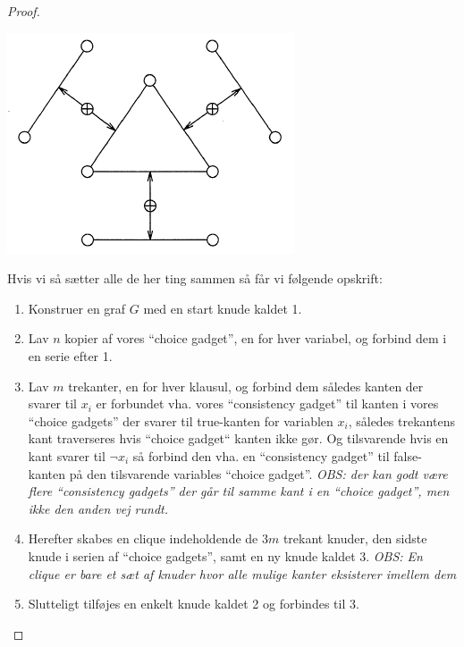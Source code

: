 \begin{proof}
\begin{center}
 \includegraphics[bb=0 0 241 185]{./constraintGadget.png}
\end{center}

Hvis vi så sætter alle de her ting sammen så får vi følgende opskrift:\\
\begin{enumerate}
 \item Konstruer en graf $G$ med en start knude kaldet 1.

 \item Lav $n$ kopier af vores ``choice gadget'', en for hver variabel, og
	 forbind dem i en serie efter 1.

 \item Lav $m$ trekanter, en for hver klausul, og forbind dem således kanten
	 der svarer til $x_i$ er forbundet vha. vores ``consistency gadget'' til
	 kanten i vores ``choice gadgets'' der svarer til true-kanten for variablen
	 $x_i$, således trekantens kant traverseres hvis ``choice gadget`` kanten
	 ikke gør. Og tilsvarende hvis en kant svarer til $\neg x_i$ så forbind den
	 vha. en ``consistency gadget'' til false-kanten på den tilsvarende
	 variables ``choice gadget''. 
	 \textit{OBS: der kan godt være flere ``consistency gadgets'' der går til
	 samme kant i en ``choice gadget'', men ikke den anden vej rundt.}

 \item Herefter skabes en clique indeholdende de $3m$ trekant knuder, den
	 sidste knude i serien af ``choice gadgets'', samt en ny knude kaldet 3.
	 \textit{OBS: En clique er bare et sæt af knuder hvor alle mulige kanter
	 eksisterer imellem dem}

 \item Slutteligt tilføjes en enkelt knude kaldet 2 og forbindes til 3.


\end{enumerate}
\end{proof}
